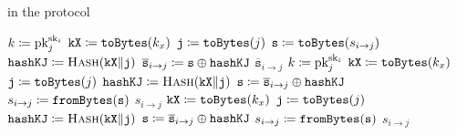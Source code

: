 \begin{algorithm}[t]
\caption{ in the  protocol}
\label{alg:dkg_encryption}
\begin{algorithmic}[1]
    \State $k \coloneqq{} \textrm{pk}{}_{j}^{\textrm{sk}{}_{i}}$
    \State $\texttt{kX} \coloneqq{} \texttt{toBytes}(k_{x})$
    \State $\texttt{j} \coloneqq{} \texttt{toBytes}(j)$
    \State $\texttt{s} \coloneqq{} \texttt{toBytes}(s_{i\to j})$
    \State $\texttt{hashKJ} \coloneqq{} \textsc{Hash}(\texttt{kX}\|\texttt{j})$
    \State $\overline{\texttt{s}}_{i\to j} \coloneqq{}
        \texttt{s} \oplus \texttt{hashKJ}$
    \State \Return $\overline{\texttt{s}}_{i\to j}$
\EndProcedure
\State
{}
    \State $k \coloneqq{} \textrm{pk}{}_{j}^{\textrm{sk}{}_{i}}$
    \State $\texttt{kX} \coloneqq{} \texttt{toBytes}(k_{x})$
    \State $\texttt{j} \coloneqq{} \texttt{toBytes}(j)$
    \State $\texttt{hashKJ} \coloneqq{} \textsc{Hash}(\texttt{kX}\|\texttt{j})$
    \State $\texttt{s} \coloneqq{}
        \overline{\texttt{s}}_{i\to j} \oplus \texttt{hashKJ}$
    \State $s_{i\to j} \coloneqq{} \texttt{fromBytes}(\texttt{s})$
    \State \Return $s_{i\to j}$
\EndProcedure
\State
{}
    \State $\texttt{kX} \coloneqq{} \texttt{toBytes}(k_{x})$
    \State $\texttt{j} \coloneqq{} \texttt{toBytes}(j)$
    \State $\texttt{hashKJ} \coloneqq{} \textsc{Hash}(\texttt{kX}\|\texttt{j})$
    \State $\texttt{s} \coloneqq{}
        \overline{\texttt{s}}_{i\to j} \oplus \texttt{hashKJ}$
    \State $s_{i\to j} \coloneqq{} \texttt{fromBytes}(\texttt{s})$
    \State \Return $s_{i\to j}$
\EndProcedure
\end{algorithmic}
\end{algorithm}
